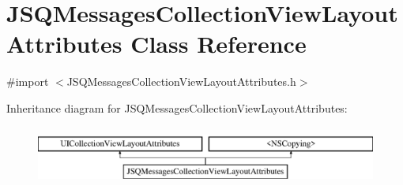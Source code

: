 \hypertarget{interface_j_s_q_messages_collection_view_layout_attributes}{}\section{J\+S\+Q\+Messages\+Collection\+View\+Layout\+Attributes Class Reference}
\label{interface_j_s_q_messages_collection_view_layout_attributes}


{\ttfamily \#import $<$J\+S\+Q\+Messages\+Collection\+View\+Layout\+Attributes.\+h$>$}

Inheritance diagram for J\+S\+Q\+Messages\+Collection\+View\+Layout\+Attributes\+:\begin{figure}[H]
\begin{center}
\leavevmode
\includegraphics[height=2.000000cm]{interface_j_s_q_messages_collection_view_layout_attributes}
\end{center}
\end{figure}
